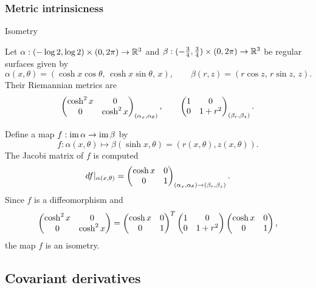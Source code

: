 \documentclass{../exp}
\def\a{\alpha}
\begin{document}

\subsubsection{Metric intrinsicness}

Isometry
\begin{ex}
Let $\a:(-\log2,\log2)\x(0,2\pi)\to\R^3$ and $\beta:(-\frac34,\frac34)\x(0,2\pi)\to\R^3$ be regular surfaces given by
\[\a(x,\theta)=(\cosh x\cos\theta,\,\cosh x\sin\theta,\,x),\qquad
\beta(r,z)=(r\cos z,\,r\sin z,\,z).\]
Their Riemannian metrics are
\[\mat{\cosh^2x&0\\0&\cosh^2x}_{(\a_x,\a_\theta)},\qquad\mat{1&0\\0&1+r^2}_{(\beta_r,\beta_z)}.\]

Define a map $f:\im\a\to\im\beta$ by
\[f:\a(x,\theta)\mapsto\beta(\sinh x,\theta)=(r(x,\theta),z(x,\theta)).\]
The Jacobi matrix of $f$ is computed
\[df|_{\a(x,\theta)}=\mat{\cosh x&0\\0&1}_{(\a_x,\a_\theta)\to(\beta_r,\beta_z)}.\]
Since $f$ is a diffeomorphism and
\[\begin{pmatrix}\cosh^2x&0\\0&\cosh^2x\end{pmatrix}=\begin{pmatrix}\cosh x&0\\0&1\end{pmatrix}^T\begin{pmatrix}1&0\\0&1+r^2\end{pmatrix}\begin{pmatrix}\cosh x&0\\0&1\end{pmatrix},\]
the map $f$ is an isometry.
\end{ex}




\subsection{Covariant derivatives}

\iffalse
\begin{cond}
\item Coordinate definition
\item Orthogonal projection
\item Axiomatic Koszul connection
\item Exterior covariant derivative
\item via parallel transport
\item Vertical projection
\end{cond}
\fi
\end{document}
